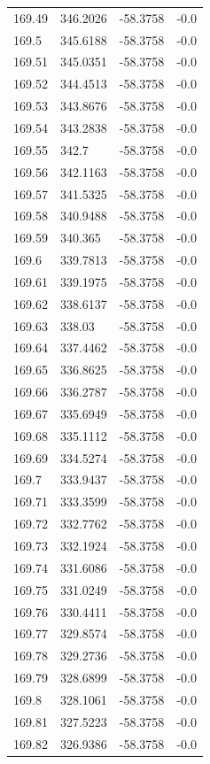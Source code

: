 \begin{table}[H]
\begin{tabular}{llll}
169.49 & 346.2026 & -58.3758 & -0.0 \\
169.5 & 345.6188 & -58.3758 & -0.0 \\
169.51 & 345.0351 & -58.3758 & -0.0 \\
169.52 & 344.4513 & -58.3758 & -0.0 \\
169.53 & 343.8676 & -58.3758 & -0.0 \\
169.54 & 343.2838 & -58.3758 & -0.0 \\
169.55 & 342.7 & -58.3758 & -0.0 \\
169.56 & 342.1163 & -58.3758 & -0.0 \\
169.57 & 341.5325 & -58.3758 & -0.0 \\
169.58 & 340.9488 & -58.3758 & -0.0 \\
169.59 & 340.365 & -58.3758 & -0.0 \\
169.6 & 339.7813 & -58.3758 & -0.0 \\
169.61 & 339.1975 & -58.3758 & -0.0 \\
169.62 & 338.6137 & -58.3758 & -0.0 \\
169.63 & 338.03 & -58.3758 & -0.0 \\
169.64 & 337.4462 & -58.3758 & -0.0 \\
169.65 & 336.8625 & -58.3758 & -0.0 \\
169.66 & 336.2787 & -58.3758 & -0.0 \\
169.67 & 335.6949 & -58.3758 & -0.0 \\
169.68 & 335.1112 & -58.3758 & -0.0 \\
169.69 & 334.5274 & -58.3758 & -0.0 \\
169.7 & 333.9437 & -58.3758 & -0.0 \\
169.71 & 333.3599 & -58.3758 & -0.0 \\
169.72 & 332.7762 & -58.3758 & -0.0 \\
169.73 & 332.1924 & -58.3758 & -0.0 \\
169.74 & 331.6086 & -58.3758 & -0.0 \\
169.75 & 331.0249 & -58.3758 & -0.0 \\
169.76 & 330.4411 & -58.3758 & -0.0 \\
169.77 & 329.8574 & -58.3758 & -0.0 \\
169.78 & 329.2736 & -58.3758 & -0.0 \\
169.79 & 328.6899 & -58.3758 & -0.0 \\
169.8 & 328.1061 & -58.3758 & -0.0 \\
169.81 & 327.5223 & -58.3758 & -0.0 \\
169.82 & 326.9386 & -58.3758 & -0.0 \\

\end{tabular}
\end{table}
